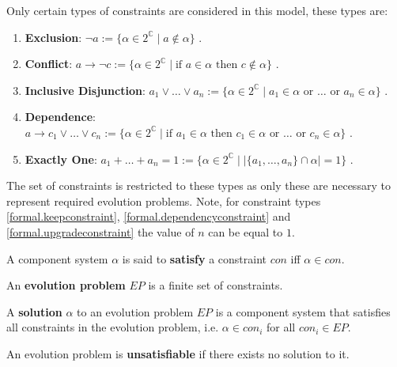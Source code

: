 Only certain types of constraints are considered in this model, these types are:
\begin{enumerate}
  \item \textbf{Exclusion}: $\neg a := \{\alpha \in 2^{\mathbb{C}} \mid a \not \in \alpha \}$ \label{formal.removeconstraint}.
  \item \textbf{Conflict}: $a \rightarrow \neg c := \{\alpha \in 2^{\mathbb{C}} \mid \mbox{if } a \in \alpha \mbox{ then } c \not \in \alpha\}$ \label{formal.conflictconstraint}.
  \item \textbf{Inclusive Disjunction}: $a_1 \vee \ldots \vee a_n := \{\alpha \in 2^{\mathbb{C}} \mid a_1 \in \alpha \mbox{ or }\ldots \mbox{ or } a_n \in \alpha\}$ \label{formal.keepconstraint}.
  \item \textbf{Dependence}: $a \rightarrow c_1 \vee \ldots \vee c_n := \{\alpha \in 2^{\mathbb{C}} \mid \mbox{if } a_1 \in \alpha \mbox{ then }  c_1 \in \alpha \mbox{ or } \ldots \mbox{ or } c_n \in \alpha\}$ \label{formal.dependencyconstraint}.
  \item \textbf{Exactly One}: $a_1 + \ldots + a_n = 1 := \{\alpha \in 2^{\mathbb{C}} \mid |\{a_1,\ldots,a_n\} \cap \alpha| = 1\}$ \label{formal.upgradeconstraint}.
\end{enumerate}
The set of constraints is restricted to these types as only these are necessary to represent required evolution problems. 
Note, for constraint types \ref{formal.keepconstraint}, \ref{formal.dependencyconstraint} and \ref{formal.upgradeconstraint} the value of $n$ can be equal to $1$.

\begin{defs}
\label{formal.constraintdefs}
A component system $\alpha$ is said to \textbf{satisfy} a constraint $con$ iff $\alpha \in con$.
\end{defs}

\begin{defs}
An \textbf{evolution problem} $EP$ is a finite set of constraints.
\end{defs}

\begin{defs}
A \textbf{solution} $\alpha$ to an evolution problem $EP$ is a component system that satisfies all constraints in the evolution problem, i.e. $\alpha \in con_i$ for all $con_i \in EP$.  
\end{defs}

\begin{defs}
An evolution problem is \textbf{unsatisfiable} if there exists no solution to it.  
\end{defs}


